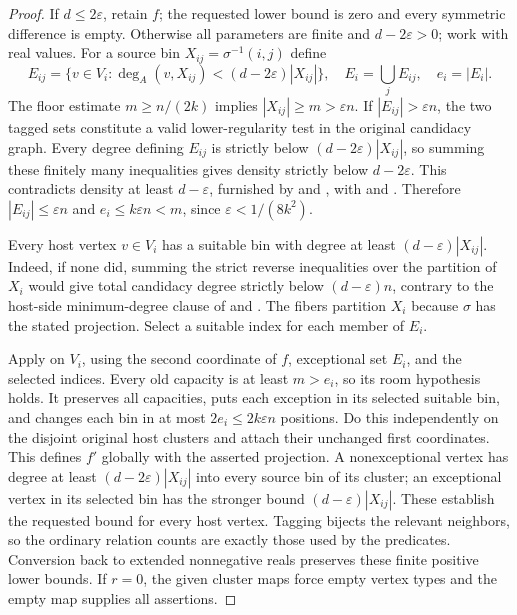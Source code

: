 \begin{proof}
If $d\leq2\varepsilon$, retain $f$; the requested lower bound is
zero and every symmetric difference is empty. Otherwise all
parameters are finite and $d-2\varepsilon>0$; work with real values.
For a source bin $X_{ij}=\sigma^{-1}(i,j)$ define
\[
 E_{ij}=\{v\in V_i:\deg_A(v,X_{ij})<(d-2\varepsilon)|X_{ij}|\},
 \quad E_i=\bigcup_j E_{ij},\quad e_i=|E_i|.
\]
The floor estimate $m\geq n/(2k)$ implies
$|X_{ij}|\geq m>\varepsilon n$.
If $|E_{ij}|>\varepsilon n$, the two tagged sets constitute a
valid lower-regularity test in the original candidacy graph.
Every degree defining $E_{ij}$ is strictly below
$(d-2\varepsilon)|X_{ij}|$, so summing these finitely many
inequalities gives density strictly below $d-2\varepsilon$.
This contradicts density at least $d-\varepsilon$, furnished by
 and
, with
 and .
Therefore $|E_{ij}|\leq\varepsilon n$ and
$e_i\leq k\varepsilon n<m$, since $\varepsilon<1/(8k^2)$.

Every host vertex $v\in V_i$ has a suitable bin with degree at
least $(d-\varepsilon)|X_{ij}|$. Indeed, if none did, summing
the strict reverse inequalities over the partition of $X_i$ would
give total candidacy degree strictly below $(d-\varepsilon)n$,
contrary to the host-side minimum-degree clause of
 and
. The fibers partition $X_i$
because $\sigma$ has the stated projection. Select a suitable index
for each member of $E_i$.

Apply  on $V_i$, using
the second coordinate of $f$, exceptional set $E_i$, and the selected
indices. Every old capacity is at least $m>e_i$, so its room
hypothesis holds. It preserves all capacities, puts each exception
in its selected suitable bin, and changes each bin in at most
$2e_i\leq2k\varepsilon n$ positions. Do this independently on
the disjoint original host clusters and attach their unchanged first
coordinates. This defines $f'$ globally with the asserted projection.
A nonexceptional vertex has degree at least
$(d-2\varepsilon)|X_{ij}|$ into every source bin of its cluster;
an exceptional vertex in its selected bin has the stronger bound
$(d-\varepsilon)|X_{ij}|$. These establish the requested bound
for every host vertex. Tagging bijects the relevant neighbors, so the
ordinary relation counts are exactly those used by the predicates.
Conversion back to extended nonnegative reals preserves these finite
positive lower bounds. If $r=0$, the given cluster maps force empty
vertex types and the empty map supplies all assertions.
\end{proof}
